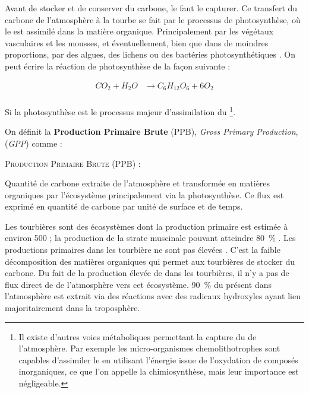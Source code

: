 Avant de stocker et de conserver du carbone, le faut le capturer.
Ce transfert du carbone de l'atmosphère à la tourbe se fait par le processus de photosynthèse, où le \coo est assimilé dans la matière organique.
Principalement par les végétaux vasculaires et les mousses, et éventuellement, bien que dans de moindres proportions, par des algues, des lichens ou des bactéries photosynthétiques \citep{girard2011}.
On peut écrire la réaction de photosynthèse de la façon suivante : 

$$\begin{aligned}
CO_{2} + H_{2}O  & \rightarrow C_{6}H_{12}O_{6} + 6O_{2}\\
\end{aligned} $$

Si la photosynthèse est le processus majeur d'assimilation du \coo \footnote{Il existe d'autres voies métaboliques permettant la capture du \coo de l'atmosphère.
Par exemple les micro-organismes chemolithotrophes sont capables d'assimiler le \coo en utilisant l'énergie issue de l'oxydation de composés inorganiques, ce que l'on appelle la chimiosynthèse, mais leur importance est négligeable.}.

On définit la \textbf{Production Primaire Brute} (PPB), \textit{Gross Primary Production}, (\textit{GPP}) comme :

\begin{pdef}
\textsc{Production Primaire Brute (PPB)} :

Quantité de carbone extraite de l'atmosphère et transformée en matières organiques par l'écosystème principalement via la photosynthèse.
Ce flux est exprimé en quantité de carbone par unité de surface et de temps.
\end{pdef}

Les tourbières sont des écosystèmes dont la production primaire est estimée à environ \SI{500}{\gcm} ;
la production de la strate muscinale pouvant atteindre \SI{80}{\percent} \citep{francez2000}.
Les productions primaires dans les tourbière ne sont pas élevées \plop.
C'est la faible décomposition des matières organiques qui permet aux tourbières de stocker du carbone.
Du fait de la production élevée de \chh dans les tourbières, il n'y a pas de flux direct de \chh de l'atmosphère vers cet écosystème.
\SI{90}{\percent} du \chh présent dans l'atmosphère est extrait via des réactions avec des radicaux hydroxyles ayant lieu majoritairement dans la troposphère.

